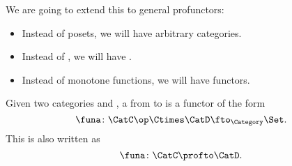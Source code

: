 We are going to extend this to general profunctors:
\begin{itemize}
  \item Instead of posets, we will have arbitrary categories.
  \item Instead of \Bool, we will have \Set.
  \item Instead of monotone functions, we will have functors.
\end{itemize}

\begin{ctdefinition}[Profunctors]
  \label{def:profunctor}
  Given two categories \CatC and \CatD, a \emph{} from \CatC to \CatD is a functor of the form
  \begin{equation}\label{eq:profunctors-def-1}
    \funa\colon \CatC\op \Ctimes \CatD \fto_{\Category} \Set.
  \end{equation}
  This is also written as
  \begin{equation}\label{eq:profunctors-def-2}
    \funa\colon \CatC \profto \CatD.
  \end{equation}
\end{ctdefinition}



